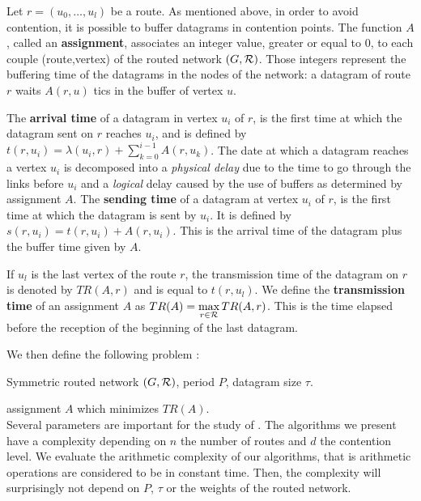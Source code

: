    Let $r=(u_0,\dots,u_l)$ be a route. As mentioned above, in order to avoid contention, it is possible to buffer datagrams in contention points. The function $A$, called an \textbf{assignment}, associates an integer value, greater or equal to $0$, to each couple (route,vertex) of the routed network $(G,{\cal R})$. Those integers represent the buffering time of the datagrams in the nodes of the network: a datagram of route $r$ waits $A(r,u)$ tics in the buffer of vertex $u$.
          
       

 The \textbf{arrival time} of a datagram in vertex $u_i$ of $r$, is the first time at which the datagram sent on $r$ reaches $u_i$, and is defined by $t(r,u_i) = \lambda(u_i,r) + \sum_{k=0}^{i-1} A(r,u_k) $. The date at which a datagram reaches a vertex $u_i$ is decomposed into a \emph{physical delay} due to the time to go through the links before $u_i$ and a \emph{logical} delay caused by the use of buffers as determined by assignment $A$.
  The \textbf{sending time} of a datagram at vertex $u_i$ of $r$, is the first time at which the datagram is sent by $u_i$. It is defined by $s(r,u_i) = t(r,u_i) +  A(r,u_i) $. This is the arrival time of the datagram plus the buffer time given by $A$.
 
  If $u_l$ is the last vertex of the route $r$, the transmission time of the datagram on 
  $r$ is denoted by $TR(A,r)$ and is equal to $t(r,u_l)$. We define the \textbf{transmission time} of an assignment $A$ as $TR(A) = \displaystyle \max\limits_{r \in {\cal R}} TR(A,r) $. This is the time elapsed before the reception of the beginning of the last datagram. 

We then define the following problem :


        Symmetric routed network $(G,{\cal R})$, period $P$, datagram size $\tau$.%
      

       assignment $A$ which minimizes $TR(A)$.
      \\
    
    Several parameters are important for the study of \spall. The algorithms we present have a complexity
    depending on $n$ the number of routes and $d$ the contention level. We evaluate the arithmetic complexity of our algorithms, that is arithmetic operations are considered to be in constant time. Then, the complexity will surprisingly not depend on $P$, $\tau$ or the weights of the routed network.

